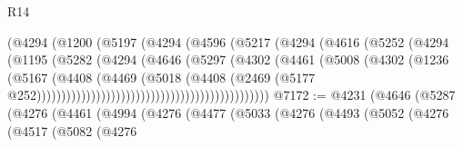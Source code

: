 \begin{lexlean}{R14}
\begin{coremodule}
                                            (@4294
                                              (@1200
                                                (@5197
                                                  (@4294
                                                    (@4596
                                                      (@5217
                                                        (@4294
                                                          (@4616
                                                            (@5252
                                                              (@4294
                                                                (@1195
                                                                  (@5282
                                                                    (@4294
                                                                      (@4646
                                                                        (@5297
                                                                          (@4302
                                                                            (@4461
                                                                              (@5008
                                                                                (@4302
                                                                                  (@1236
                                                                                    (@5167
                                                                                      (@4408
                                                                                        (@4469
                                                                                          (@5018
                                                                                            (@4408
                                                                                              (@2469
                                                                                                (@5177
                                                                                                  @252)))))))))))))))))))))))))))))))))))))))))))))))
@7172 := @4231
    (@4646
      (@5287
        (@4276
          (@4461
            (@4994
              (@4276
                (@4477
                  (@5033
                    (@4276
                      (@4493
                        (@5052
                          (@4276
                            (@4517
                              (@5082
                                (@4276

\end{coremodule}
\end{lexlean}
